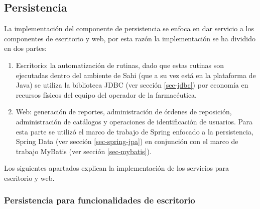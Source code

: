 \subsection{Persistencia}
La implementación del componente de persistencia se enfoca en dar servicio a los componentes de escritorio y web, por esta razón la implementación se ha dividido en dos partes:
\begin{enumerate}
 	\item Escritorio: la automatización de rutinas, dado que estas rutinas son ejecutadas dentro del ambiente de Sahi (que a su vez está en la plataforma de Java) se utiliza la biblioteca JDBC (ver sección \ref{sec-jdbc}) por economía en recursos físicos del equipo del operador de la farmacéutica.
 	\item Web: generación de reportes, administración de órdenes de reposición, administración de catálogos y operaciones de identificación  de usuarios. Para esta parte se utilizó el marco de trabajo de Spring enfocado a la persistencia, Spring Data (ver sección \ref{sec-spring-jpa}) en conjunción con el marco de trabajo MyBatis (ver sección \ref{sec-mybatis}).
\end{enumerate}
Los siguientes apartados explican la implementación de los servicios para escritorio y web.

\subsubsection{Persistencia para funcionalidades de escritorio}
